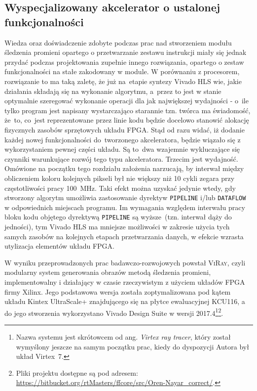 \subsection{Wyspecjalizowany akcelerator o ustalonej funkcjonalności}
Wiedza oraz doświadczenie zdobyte podczas prac nad stworzeniem modułu śledzenia promieni opartego o przetwarzanie zestawu instrukcji miały się jednak przydać podczas projektowania zupełnie innego rozwiązania, opartego o zestaw funkcjonalności na stałe zakodowany w module. W porównaniu z procesorem, rozwiązanie to ma taką zaletę, że już na~etapie syntezy Vivado HLS wie, jakie działania składają się na wykonanie algorytmu, a~przez to jest w stanie optymalnie szeregować wykonanie operacji dla jak największej wydajności - o~ile tylko program jest napisany wystarczająco starannie tzn. twórca ma świadomość, że~to, co~jest reprezentowane przez linie kodu będzie docelowo stanowić alokację fizycznych zasobów sprzętowych układu FPGA. Stąd od razu widać, iż dodanie każdej nowej funkcjonalności do~tworzonego akceleratora, będzie wiązało się z wykorzystaniem pewnej części układu. Są to~dwa wzajemnie wykluczające się czynniki warunkujące rozwój tego typu akceleratora. Trzecim jest wydajność. Omówione na początku tego rozdziału założenia narzucają, by interwał między obliczeniem koloru kolejnych pikseli był nie większy niż 10 cykli zegara przy częstotliwości pracy 100~MHz. Taki efekt można uzyskać jedynie wtedy, gdy stworzony algorytm umożliwia zastosowanie dyrektyw \texttt{PIPELINE} i/lub \texttt{DATAFLOW} w odpowiednich miejscach programu. Im wymagania względem interwału pracy bloku kodu objętego dyrektywą \texttt{PIPELINE} są wyższe~(tzn. interwał dąży do jedności), tym  Vivado HLS ma mniejsze możliwości w zakresie użycia tych samych zasobów na kolejnych etapach przetwarzania danych, w efekcie wzrasta utylizacja elementów układu FPGA.

W wyniku przeprowadzonych prac badawczo-rozwojowych powstał \textsc{ViRay}, czyli modularny system generowania obrazów metodą śledzenia promieni, implementowalny i działający w czasie rzeczywistym z użyciem układów FPGA firmy Xilinx. Jego podstawowa wersja została zoptymalizowana pod kątem układu  Kintex UltraScale+ znajdującego się na płytce ewaluacyjnej KCU116, a do jego stworzenia wykorzystano Vivado Design Suite w wersji 2017.4\footnote{Nazwa systemu jest skrótowcem od ang. \textit{Virtex ray tracer}, który został wymyślony jeszcze na samym początku prac, kiedy do dyspozycji Autora był układ Virtex~7.}\footnote{Pliki projektu dostępne są pod adresem: \url{https://bitbucket.org/rtMasters/ffcore/src/Oren-Nayar_correct/}.}.

